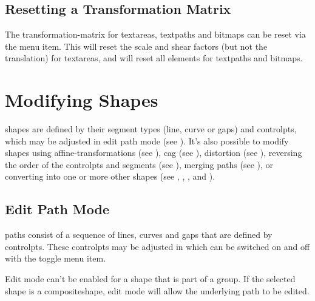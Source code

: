 
\section{Resetting a Transformation Matrix}\label{sec:resetmatrix}


The \gls{transformation-matrix} for \glspl{textarea}, \glspl{textpath}
and \glspl{bitmap} can be reset via the
 menu item. This will reset the scale
and shear factors (but not the translation) for \glspl{textarea},
and will reset all elements for \glspl{textpath} and \glspl{bitmap}.

\chapter{Modifying Shapes}\label{sec:modshape}

\Glspl{shape} are defined by their segment types (line, \gls{curve}
or \glspl{gap}) and \glspl{controlpt}, which may be adjusted in edit
path mode (see ). It's also possible to
modify \glspl{shape} using \glspl{affine-transformation} (see
), \gls{cag} (see ),
distortion (see ), reversing the order of
the \glspl{controlpt} and segments (see ), merging paths (see
), or converting into one or more other
\glspl{shape} (see ,
, ,
 and
). 

\section{Edit Path Mode}\label{sec:editpath}


\Glspl{path} consist of a sequence of lines, curves and \glspl{gap} 
that are defined by \glspl{controlpt}. These \glspl{controlpt} may be adjusted in
\emph{} which can be switched on and off
with the  toggle menu item.

\begin{information}
Edit mode can't be enabled for a \gls{shape} that is part of a \gls{group}.
If the selected shape is a \gls{compositeshape}, edit mode will allow the
underlying path to be edited.
\end{information}

